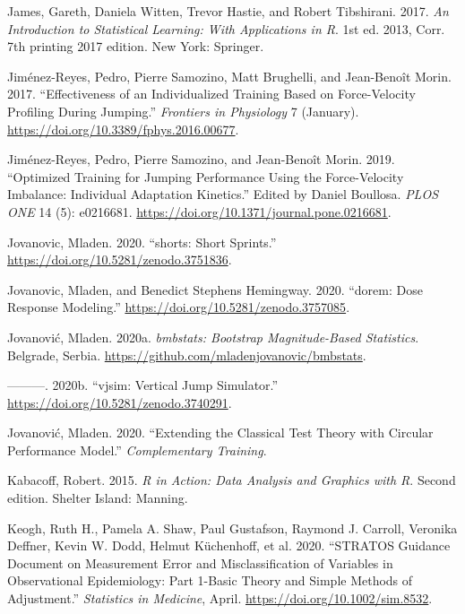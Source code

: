 \documentclass[
]{book}
\newlength{\cslhangindent}
\newenvironment{cslreferences}%
  {\setlength{\parindent}{0pt}%
  \everypar{\setlength{\hangindent}{\cslhangindent}}\ignorespaces}%
  {\par}
\begin{document}
\begin{cslreferences}
\leavevmode\hypertarget{ref-jamesIntroductionStatisticalLearning2017}{}%
James, Gareth, Daniela Witten, Trevor Hastie, and Robert Tibshirani. 2017. \emph{An Introduction to Statistical Learning: With Applications in R}. 1st ed. 2013, Corr. 7th printing 2017 edition. New York: Springer.

\leavevmode\hypertarget{ref-jimenez-reyesEffectivenessIndividualizedTraining2017}{}%
Jiménez-Reyes, Pedro, Pierre Samozino, Matt Brughelli, and Jean-Benoît Morin. 2017. ``Effectiveness of an Individualized Training Based on Force-Velocity Profiling During Jumping.'' \emph{Frontiers in Physiology} 7 (January). \url{https://doi.org/10.3389/fphys.2016.00677}.

\leavevmode\hypertarget{ref-jimenez-reyesOptimizedTrainingJumping2019}{}%
Jiménez-Reyes, Pedro, Pierre Samozino, and Jean-Benoît Morin. 2019. ``Optimized Training for Jumping Performance Using the Force-Velocity Imbalance: Individual Adaptation Kinetics.'' Edited by Daniel Boullosa. \emph{PLOS ONE} 14 (5): e0216681. \url{https://doi.org/10.1371/journal.pone.0216681}.

\leavevmode\hypertarget{ref-R-shorts}{}%
Jovanovic, Mladen. 2020. ``shorts: Short Sprints.'' \url{https://doi.org/10.5281/zenodo.3751836}.

\leavevmode\hypertarget{ref-R-dorem}{}%
Jovanovic, Mladen, and Benedict Stephens Hemingway. 2020. ``dorem: Dose Response Modeling.'' \url{https://doi.org/10.5281/zenodo.3757085}.

\leavevmode\hypertarget{ref-R-bmbstats}{}%
Jovanović, Mladen. 2020a. \emph{bmbstats: Bootstrap Magnitude-Based Statistics}. Belgrade, Serbia. \url{https://github.com/mladenjovanovic/bmbstats}.

\leavevmode\hypertarget{ref-R-vjsim}{}%
---------. 2020b. ``vjsim: Vertical Jump Simulator.'' \url{https://doi.org/10.5281/zenodo.3740291}.

\leavevmode\hypertarget{ref-jovanovicExtendingClassicalTest2020}{}%
Jovanović, Mladen. 2020. ``Extending the Classical Test Theory with Circular Performance Model.'' \emph{Complementary Training}.

\leavevmode\hypertarget{ref-kabacoffActionDataAnalysis2015}{}%
Kabacoff, Robert. 2015. \emph{R in Action: Data Analysis and Graphics with R}. Second edition. Shelter Island: Manning.

\leavevmode\hypertarget{ref-keoghSTRATOSGuidanceDocument2020}{}%
Keogh, Ruth H., Pamela A. Shaw, Paul Gustafson, Raymond J. Carroll, Veronika Deffner, Kevin W. Dodd, Helmut Küchenhoff, et al. 2020. ``STRATOS Guidance Document on Measurement Error and Misclassification of Variables in Observational Epidemiology: Part 1-Basic Theory and Simple Methods of Adjustment.'' \emph{Statistics in Medicine}, April. \url{https://doi.org/10.1002/sim.8532}.


\end{cslreferences}
\end{document}
